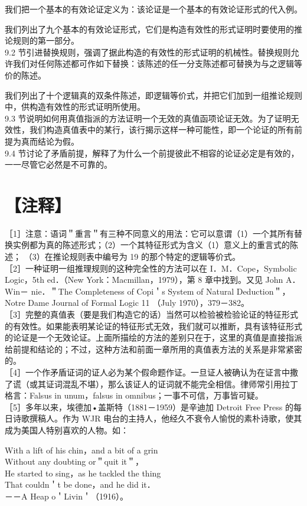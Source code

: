 我们把一个基本的有效论证定义为：该论证是一个基本的有效论证形式的代入例。

我们列出了九个基本的有效论证形式，它们是构造有效性的形式证明时要使用的推论规则的第一部分。\\
9.2 节引进替换规则，强调了据此构造的有效性的形式证明的机械性。替换规则允许我们对任何陈述都可作如下替换：该陈述的任一分支陈述都可替换为与之逻辑等价的陈述。

我们列出了十个逻辑真的双条件陈述，即逻辑等价式，并把它们加到一组推论规则中，供构造有效性的形式证明所使用。\\
9.3 节说明如何用真值指派的方法证明一个无效的真值函项论证无效。为了证明无效性，我们构造真值表中的某行，该行揭示这样一种可能性，即一个论证的所有前提为真而结论为假。\\
9.4 节讨论了矛盾前提，解释了为什么一个前提彼此不相容的论证必定是有效的，一一尽管它必然是不可靠的。

\section*{【注释】}
［1］注意：语词＂重言＂有三种不同意义的用法：它可以意谓（1）一个其所有替换实例都为真的陈述形式；（2）一个其特征形式为含义（1）意义上的重言式的陈述； （3）在推论规则表中编号为 19 的那个特定的逻辑等价式。\\
［2］一种证明一组推理规则的这种完全性的方法可以在 I．M．Cope，Symbolic Logic，5th ed．（New York：Macmillan，1979），第 8 章中找到。又见 John A．Win－ nie．＂The Completeness of Copi＇s System of Natural Deduction＂，Notre Dame Journal of Formal Logic 11 （July 1970），379－382。\\
［3］完整的真值表（要是我们构造它的话）当然可以检验被检验论证的特征形式的有效性。如果能表明某论证的特征形式无效，我们就可以推断，具有该特征形式的论证是一个无效论证。上面所描绘的方法的差别只在于，这里的真值是直接指派给前提和结论的；不过，这种方法和前面一章所用的真值表方法的关系是非常紧密的。\\
［4］一个作矛盾证词的证人必为某个假命题作证。一旦证人被确认为在证言中撒了谎（或其证词混乱不堪），那么该证人的证词就不能完全相信。律师常引用拉丁格言：Falsus in unum，falsus in omnibus；一事不可信，万事皆可疑。\\
［5］多年以来，埃德加•盖斯特（1881－1959）是辛迪加 Detroit Free Press 的每日诗歌撰稿人。作为 WJR 电台的主持人，他经久不衰令人愉悦的素朴诗歌，使其成为美国人特别喜欢的人物。如：

With a lift of his chin，and a bit of a grin\\
Without any doubting or＂quit it＂，\\
He started to sing，as he tackled the thing\\
That couldn＇t be done，and he did it．\\
－－A Heap o＇Livin＇（1916）。

